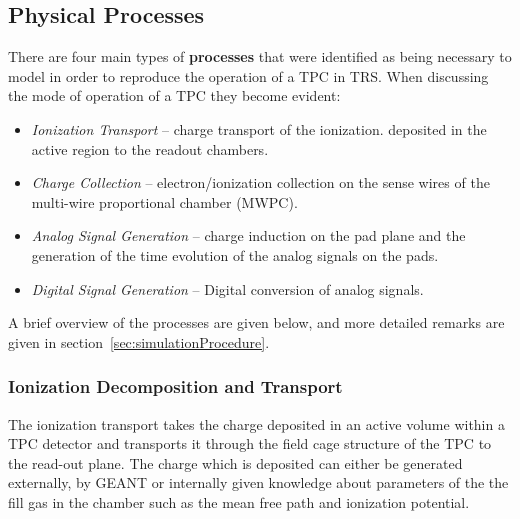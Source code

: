 \documentclass[twoside]{article}
\newcommand{\name}[1]{\textsf{#1}}%
\begin{document}
\subsection{Physical Processes}
\label{sec:processes}

There are four main types of {\bf processes} that were identified 
as being necessary to model in order to reproduce the operation of 
a TPC in \name{TRS}.  When discussing the mode of operation of a TPC 
they become evident:
\begin{itemize}
  \item {\em Ionization Transport} -- charge transport of the ionization.
    deposited in the active region to the readout chambers.
  \item {\em Charge Collection} -- electron/ionization collection on the
    sense wires of the multi-wire proportional chamber (MWPC).
  \item {\em Analog Signal Generation} -- charge induction on the pad plane and
    the generation of the time evolution of the analog signals on the pads.
  \item {\em Digital Signal Generation} -- Digital conversion of analog signals.
\end{itemize}
A brief overview of the processes are given below, and more detailed
remarks are given in section~\ref{sec:simulationProcedure}.

\subsubsection{Ionization Decomposition and Transport}
\label{sec:ionizationTransport}

The ionization transport takes the charge deposited in an active volume
within a TPC detector and transports it through the field cage structure of
the TPC to the read-out plane.  The charge which is deposited can either
be generated externally, by GEANT  or internally
given knowledge about parameters of the the fill gas in the chamber such
as the mean free path and ionization potential.
\end{document}
